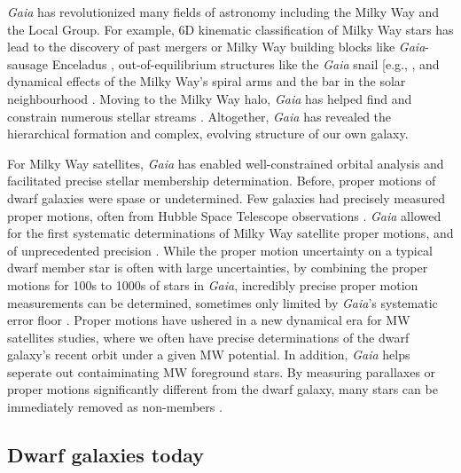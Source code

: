 \emph{Gaia} has revolutionized many fields of astronomy including the
Milky Way and the Local Group. For example, 6D kinematic classification
of Milky Way stars has lead to the discovery of past mergers or Milky
Way building blocks like \emph{Gaia}-sausage Enceladus
\citep[e.g.,][]{helmi+2018}, out-of-equilibrium structures like the
\emph{Gaia} snail {[}e.g., \citet{antoja+2018l}, and dynamical effects
of the Milky Way's spiral arms and the bar in the solar neighbourhood
\citep{hunt+vasiliev2025}. Moving to the Milky Way halo, \emph{Gaia} has
helped find and constrain numerous stellar streams
\citep{bonaca+price-whelan2025}. Altogether, \emph{Gaia} has revealed
the hierarchical formation and complex, evolving structure of our own
galaxy.

For Milky Way satellites, \emph{Gaia} has enabled well-constrained
orbital analysis and facilitated precise stellar membership
determination. Before, proper motions of dwarf galaxies were spase or
undetermined. Few galaxies had precisely measured proper motions, often
from Hubble Space Telescope observations \citep[e.g.,][]{sohn+2017}.
\emph{Gaia} allowed for the first systematic determinations of Milky Way
satellite proper motions, and of unprecedented precision
\citep{MV2020a, pace+li2019}. While the proper motion uncertainty on a
typical dwarf member star is often with large uncertainties, by
combining the proper motions for 100s to 1000s of stars in \emph{Gaia},
incredibly precise proper motion measurements can be determined,
sometimes only limited by \emph{Gaia}'s systematic error floor
\citep[e.g.,][]{MV2020a}. Proper motions have ushered in a new dynamical
era for MW satellites studies, where we often have precise
determinations of the dwarf galaxy's recent orbit under a given MW
potential. In addition, \emph{Gaia} helps seperate out contaiminating MW
foreground stars. By measuring parallaxes or proper motions
significantly different from the dwarf galaxy, many stars can be
immediately removed as non-members
\citep[e.g.,][\citet{jensen2024}]{battaglia+2022}.

\subsection{Dwarf galaxies today}\label{dwarf-galaxies-today}

